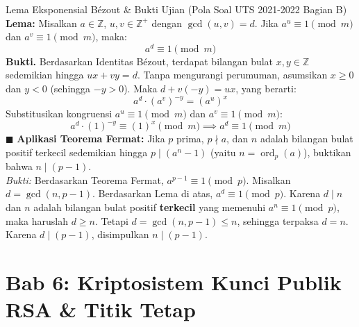 \documentclass[11pt,a4paper]{article}
\newenvironment{proof}{\noindent\textbf{Bukti.}}{\hfill$\blacksquare$\vspace{0.3em}}
\begin{document}
\begin{thmbox}{Lema Eksponensial B\'ezout \& Bukti Ujian (Pola Soal UTS 2021-2022 Bagian B)}
\textbf{Lema:} Misalkan $a \in \mathbb{Z}$, $u, v \in \mathbb{Z}^+$ dengan $\gcd(u, v) = d$. Jika $a^u \equiv 1 \pmod m$ dan $a^v \equiv 1 \pmod m$, maka:
\[
a^d \equiv 1 \pmod m
\]
\begin{proof}
Berdasarkan Identitas B\'ezout, terdapat bilangan bulat $x, y \in \mathbb{Z}$ sedemikian hingga $u x + v y = d$. Tanpa mengurangi perumuman, asumsikan $x \ge 0$ dan $y < 0$ (sehingga $-y > 0$). Maka $d + v(-y) = ux$, yang berarti:
\[
a^d \cdot (a^v)^{-y} = (a^u)^x
\]
Substitusikan kongruensi $a^u \equiv 1 \pmod m$ dan $a^v \equiv 1 \pmod m$:
\[
a^d \cdot (1)^{-y} \equiv (1)^x \pmod m \implies a^d \equiv 1 \pmod m
\]
\end{proof}
\textbf{Aplikasi Teorema Fermat:} Jika $p$ prima, $p \nmid a$, dan $n$ adalah bilangan bulat positif terkecil sedemikian hingga $p \mid (a^n - 1)$ (yaitu $n = \operatorname{ord}_p(a)$), buktikan bahwa $n \mid (p - 1)$.\\
\textit{Bukti:} Berdasarkan Teorema Fermat, $a^{p-1} \equiv 1 \pmod p$. Misalkan $d = \gcd(n, p-1)$. Berdasarkan Lema di atas, $a^d \equiv 1 \pmod p$. Karena $d \mid n$ dan $n$ adalah bilangan bulat positif \textbf{terkecil} yang memenuhi $a^n \equiv 1 \pmod p$, maka haruslah $d \ge n$. Tetapi $d = \gcd(n, p-1) \le n$, sehingga terpaksa $d = n$. Karena $d \mid (p - 1)$, disimpulkan $n \mid (p - 1)$.
\end{thmbox}

\newpage
\section{Bab 6: Kriptosistem Kunci Publik RSA \& Titik Tetap}
\end{document}

